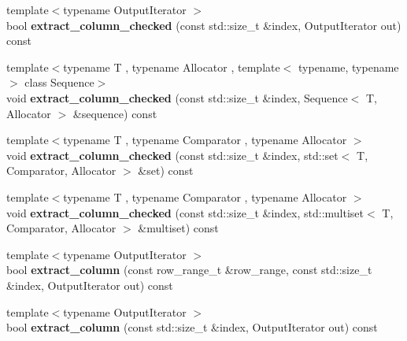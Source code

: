 \begin{DoxyCompactItemize}
\item 
\hypertarget{classstrtk_1_1token__grid_ae7d21a89311b8fd2c9af332860ba8353}{{\footnotesize template$<$typename Output\-Iterator $>$ }\\bool {\bfseries extract\-\_\-column\-\_\-checked} (const std\-::size\-\_\-t \&index, Output\-Iterator out) const }\label{classstrtk_1_1token__grid_ae7d21a89311b8fd2c9af332860ba8353}

\item 
\hypertarget{classstrtk_1_1token__grid_a28cbdd3c20d5501889a4eb817a5392cd}{{\footnotesize template$<$typename T , typename Allocator , template$<$ typename, typename $>$ class Sequence$>$ }\\void {\bfseries extract\-\_\-column\-\_\-checked} (const std\-::size\-\_\-t \&index, Sequence$<$ T, Allocator $>$ \&sequence) const }\label{classstrtk_1_1token__grid_a28cbdd3c20d5501889a4eb817a5392cd}

\item 
\hypertarget{classstrtk_1_1token__grid_a7e6cc8033653481c8bc57bfb00125b7a}{{\footnotesize template$<$typename T , typename Comparator , typename Allocator $>$ }\\void {\bfseries extract\-\_\-column\-\_\-checked} (const std\-::size\-\_\-t \&index, std\-::set$<$ T, Comparator, Allocator $>$ \&set) const }\label{classstrtk_1_1token__grid_a7e6cc8033653481c8bc57bfb00125b7a}

\item 
\hypertarget{classstrtk_1_1token__grid_aeffa5a82d3d763fe511b8d9316bec442}{{\footnotesize template$<$typename T , typename Comparator , typename Allocator $>$ }\\void {\bfseries extract\-\_\-column\-\_\-checked} (const std\-::size\-\_\-t \&index, std\-::multiset$<$ T, Comparator, Allocator $>$ \&multiset) const }\label{classstrtk_1_1token__grid_aeffa5a82d3d763fe511b8d9316bec442}

\item 
\hypertarget{classstrtk_1_1token__grid_a0539b939bcbd0dbdce9619ad1dbdbe68}{{\footnotesize template$<$typename Output\-Iterator $>$ }\\bool {\bfseries extract\-\_\-column} (const row\-\_\-range\-\_\-t \&row\-\_\-range, const std\-::size\-\_\-t \&index, Output\-Iterator out) const }\label{classstrtk_1_1token__grid_a0539b939bcbd0dbdce9619ad1dbdbe68}

\item 
\hypertarget{classstrtk_1_1token__grid_ac9c132ee606b0bc701807cd6fc448191}{{\footnotesize template$<$typename Output\-Iterator $>$ }\\bool {\bfseries extract\-\_\-column} (const std\-::size\-\_\-t \&index, Output\-Iterator out) const }\label{classstrtk_1_1token__grid_ac9c132ee606b0bc701807cd6fc448191}


\end{DoxyCompactItemize}
